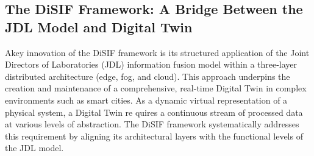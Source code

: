 \documentclass[5p,times]{elsarticle}
\begin{document}


    








\subsection{The DiSIF Framework: A Bridge Between the JDL Model and Digital Twin}

Akey innovation of the DiSIF framework is its structured
application of the Joint Directors of Laboratories (JDL) information fusion model within a three-layer distributed architecture
(edge, fog, and cloud). This approach underpins the creation
and maintenance of a comprehensive, real-time Digital Twin
in complex environments such as smart cities. As a dynamic
virtual representation of a physical system, a Digital Twin re
quires a continuous stream of processed data at various levels
of abstraction. The DiSIF framework systematically addresses
this requirement by aligning its architectural layers with the
functional levels of the JDL model.
\end{document}
